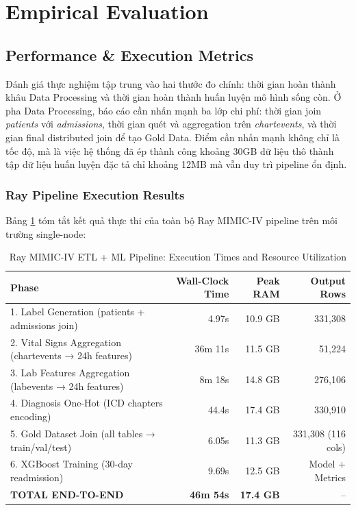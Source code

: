 \section{Empirical Evaluation}

\subsection{Performance \& Execution Metrics}
Đánh giá thực nghiệm tập trung vào hai thước đo chính: thời gian hoàn thành khâu Data Processing và thời gian hoàn thành huấn luyện mô hình sống còn. Ở pha Data Processing, báo cáo cần nhấn mạnh ba lớp chi phí: thời gian join \textit{patients} với \textit{admissions}, thời gian quét và aggregation trên \textit{chartevents}, và thời gian final distributed join để tạo Gold Data. Điểm cần nhấn mạnh không chỉ là tốc độ, mà là việc hệ thống đã ép thành công khoảng 30GB dữ liệu thô thành tập dữ liệu huấn luyện đặc tả chỉ khoảng 12MB mà vẫn duy trì pipeline ổn định.

\subsubsection{Ray Pipeline Execution Results}

Bảng \ref{table:ray_execution} tóm tắt kết quả thực thi của toàn bộ Ray MIMIC-IV pipeline trên môi trường single-node:

\begin{table}[h!]
\centering
\small
\begin{tabular}{|l|r|r|r|}
\hline
\textbf{Phase} & \textbf{Wall-Clock Time} & \textbf{Peak RAM} & \textbf{Output Rows} \\
\hline
1. Label Generation (patients + admissions join) & 4.97s & 10.9 GB & 331,308 \\
2. Vital Signs Aggregation (chartevents → 24h features) & 36m 11s & 11.5 GB & 51,224 \\
3. Lab Features Aggregation (labevents → 24h features) & 8m 18s & 14.8 GB & 276,106 \\
4. Diagnosis One-Hot (ICD chapters encoding) & 44.4s & 17.4 GB & 330,910 \\
5. Gold Dataset Join (all tables → train/val/test) & 6.05s & 11.3 GB & 331,308 (116 cols) \\
6. XGBoost Training (30-day readmission) & 9.69s & 12.5 GB & Model + Metrics \\
\hline
\textbf{TOTAL END-TO-END} & \textbf{46m 54s} & \textbf{17.4 GB} & -- \\
\hline
\end{tabular}
\caption{Ray MIMIC-IV ETL + ML Pipeline: Execution Times and Resource Utilization}
\label{table:ray_execution}
\end{table}

